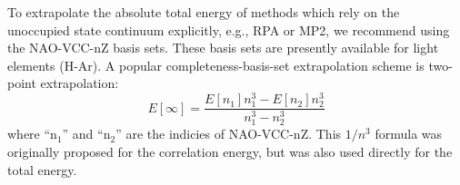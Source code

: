 To extrapolate the absolute total energy of methods which rely on the
unoccupied state continuum explicitly, e.g., RPA or MP2, 
we recommend using the NAO-VCC-nZ basis sets. These basis sets are
presently available for light elements (H-Ar). 
A popular completeness-basis-set extrapolation scheme is two-point
extrapolation:
\begin{equation*}
	E[\infty]=\frac{E[n_1]n_1^3-E[n_2]n_2^3}{n_1^3-n_2^3}
\end{equation*}
where ``n$_1$'' and ``n$_2$'' are the indicies of NAO-VCC-nZ.
This $1/n^3$ formula was originally proposed for the correlation energy,
but was also used directly for the total energy.
